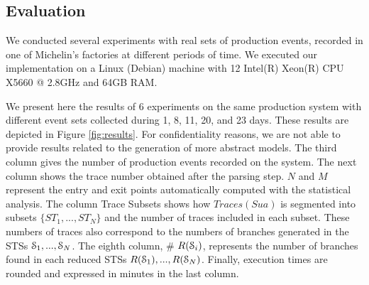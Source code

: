 %
%
%

\subsection{Evaluation}

We conducted several experiments with real sets of production
events, recorded in one of Michelin's factories at different
periods of time. We executed our implementation on a Linux
(Debian) machine with 12 Intel(R) Xeon(R) CPU X5660 @ 2.8GHz and
64GB RAM.

We present here the results of 6 experiments on the same
production system with different event sets
collected during 1, 8, 11, 20, and 23 days. These results are
depicted in Figure \ref{fig:results}. For confidentiality
reasons, we are not able to provide results related to the
generation of more abstract models. The third column gives the
number of production events recorded on the system. The next
column shows the trace number obtained after the parsing step.
$N$ and $M$ represent the entry and exit points automatically
computed with the statistical analysis. The column Trace Subsets
shows how $Traces(Sua)$ is segmented into subsets
$\{ST_1,...,ST_N\}$ and the number of traces included in each
subset. These numbers of traces also correspond to the numbers of
branches generated in the STSs
$\EuScript{S}_1,...,\EuScript{S}_N$. The eighth column, \#
$R(\EuScript{S}_i)$, represents the number of branches found in
each reduced STSs $R(\EuScript{S}_1),...,R(\EuScript{S}_N)$.
Finally, execution times are rounded and expressed in minutes in
the last column.


